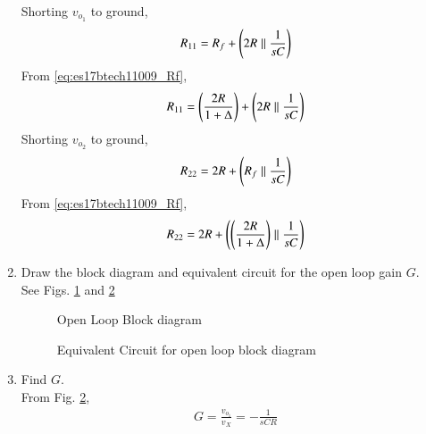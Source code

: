\begin{enumerate}[label=\arabic*.,ref=\theenumi]
Shorting $v_{o_1}$ to ground,
\begin{align}
    R_{11} = R_{f} + \left(2R\parallel \frac{1}{sC}\right)
\end{align}
From \eqref{eq:es17btech11009_Rf},
\begin{align}
    R_{11} = \left(\frac{2R}{1+ \Delta}\right) + \left(2R \parallel \frac{1}{sC}\right)
\end{align}
Shorting $v_{o_2}$ to ground,
\begin{align}
    R_{22} = 2R + \left(R_{f}\parallel \frac{1}{sC}\right)
\end{align}
From \eqref{eq:es17btech11009_Rf},
\begin{align}
    R_{22} =  2R + \left(\left(\frac{2R}{1 + \Delta}\right)\parallel \frac{1}{sC}\right)
\end{align}
%
\item Draw the block diagram and equivalent circuit for the open loop gain $G$.
\\
\solution See Figs.  \ref{fig:es17btech11009_block1} and \ref{fig:es17btech11009_block2}
\renewcommand{\thefigure}{\theenumi.\arabic{figure}}
\begin{figure}[!ht]
	\begin{center}
		\resizebox{\columnwidth}{!}{}
	\end{center}
\caption{Open Loop Block diagram}
\label{fig:es17btech11009_block1}
\end{figure}

\begin{figure}[!ht]
	\begin{center}
		\resizebox{\columnwidth}{!}{}
	\end{center}
\caption{Equivalent Circuit for open loop block diagram}
\label{fig:es17btech11009_block2}
\end{figure}
\renewcommand{\thefigure}{\theenumi}
\item Find $G$.
\\
\solution From Fig. \ref{fig:es17btech11009_block2},
%
\begin{align}
    G = \frac{v_{o_1}}{v_{X}} = -\frac{1}{sCR}
    \label{eq:es17btech11009_G}
\end{align}


\end{enumerate}
